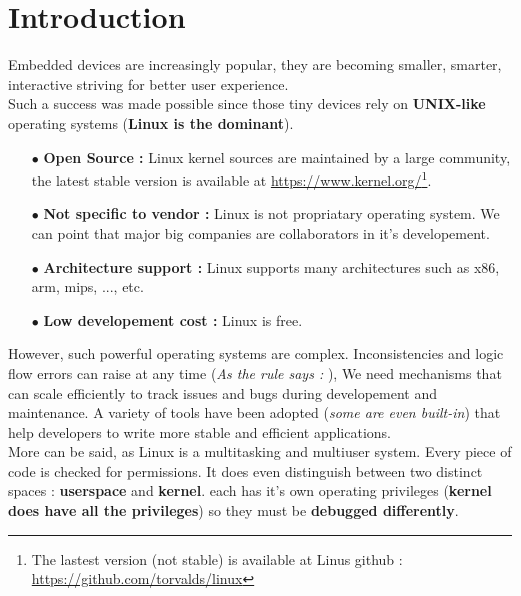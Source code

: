 \section{Introduction}
{\setlength{\baselineskip}{2em}
 Embedded devices are increasingly popular, they are becoming smaller, smarter, interactive striving for better user experience.\\

Such a success was made possible since those tiny devices rely on \textbf{UNIX-like} operating systems (\textbf{Linux is the dominant}). 

\begin{itemize}
	\item[$\bullet$] \textbf{Open Source : } Linux kernel sources are maintained by a large community, the latest stable version is available at {\color{blue}\url{https://www.kernel.org/}}\footnote{The lastest version (not stable) is available at Linus github : {\color{blue}\url{https://github.com/torvalds/linux}}}.
	
	\item[$\bullet$] \textbf{Not specific to vendor : } Linux is not propriatary operating system. We can point that major big companies are collaborators in it's developement.
	
	\item[$\bullet$] \textbf{Architecture support : } Linux supports many architectures such as x86, arm, mips, ..., etc.
	
	\item[$\bullet$] \textbf{Low developement cost : } Linux is free. 
\end{itemize}

\vspace{10px}

However, such powerful operating systems are complex. Inconsistencies and logic flow errors can raise at any time (\textit{As the rule says :  \fg}),
We need mechanisms that can scale efficiently to track issues and bugs during developement and maintenance. A variety of tools have been adopted (\textit{some are even built-in}) that help developers to write more stable and efficient applications.\\

\vspace{10px}
\setlength{\baselineskip}{1.5em}
More can be said, as Linux is a multitasking and multiuser system. Every piece of code is checked for permissions. It
does even distinguish between two distinct spaces : \textbf{userspace} and \textbf{kernel}. each has it's own operating privileges (\textbf{kernel does have all the privileges}) so they must be \textbf{debugged differently}.
}
